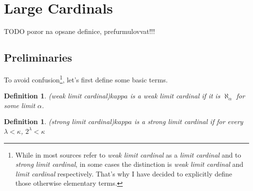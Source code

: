 \documentclass[12pt,a4paper]{article}
\newtheorem{definition}[theorem]{Definition}
\begin{document}
\section{Large Cardinals}

TODO pozor na opsane definice, prefurmulovvat!!!

\subsection{Preliminaries}
To avoid confusion\footnote{While in most sources refer to \emph{weak limit cardinal} as a \emph{limit cardinal} and to \emph{strong limit cardinal}, in some cases the distinction is \emph{weak limit cardinal} and \emph{limit cardinal} respectively. That's why I have decided to explicitly define those otherwise elementary terms.}, let's first define some basic terms.
\begin{definition}(weak limit cardinal)\label{def:weak_limit}
$kappa$ is a \emph{weak limit cardinal} if it is $\aleph_\alpha$ for some limit $\alpha$.
\end{definition}
\begin{definition}(strong limit cardinal)\label{def:strong_limit}
$kappa$ is a \emph{strong limit cardinal} if for every $\lambda < \kappa$, $2^\lambda < \kappa$
\end{definition}
\end{document}
